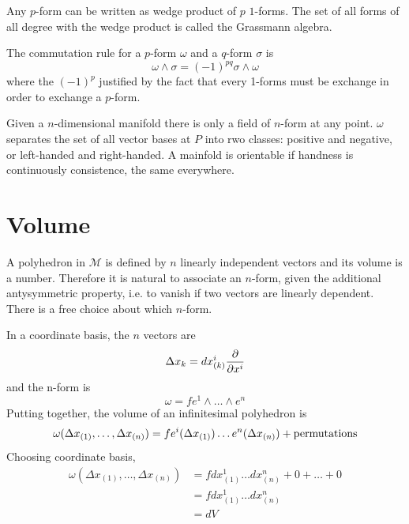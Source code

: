     Any $p$-form can be written as wedge product of $p$ $1$-forms. The set of all forms of all degree with the wedge product is called the Grassmann algebra. 

    The commutation rule for a $p$-form $\omega$ and a $q$-form $\sigma$ is 
    \begin{equation*}
        \omega \wedge \sigma = (-1)^{pq} \sigma \wedge \omega
    \end{equation*}
    where the $(-1)^p$ justified by the fact that every 1-forms must be exchange in order to exchange a $p$-form.

    Given a $n$-dimensional manifold there is only a field of $n$-form at any point. $\omega$ separates the set of all vector bases at $P$ into rwo classes: positive and negative, or left-handed and right-handed. A mainfold is orientable if handness is continuously consistence, the same everywhere. 

\section{Volume}   

    A polyhedron in $\mathcal M$ is defined by $n$ linearly independent vectors and its volume is a number. Therefore it is natural to associate an $n$-form, given the additional antysymmetric property, i.e. to vanish if two vectors are linearly dependent. There is a free choice about which $n$-form.
    
    In a coordinate basis, the $n$ vectors are
    \begin{equation*}
        \Delta x_k = dx^i_{(k)} \frac{\partial}{\partial x^i}
    \end{equation*}
    and the n-form is 
    \begin{equation*}
        \omega = f e^1 \wedge \ldots \wedge e^n
    \end{equation*}
    Putting together, the volume of an infinitesimal polyhedron is 
    \begin{equation*}
        \omega (\Delta x_{(1)}, \ldots, \Delta x_{(n)}) = f e^i(\Delta x_{(1)}) \ldots e^n(\Delta x_{(n)}) + \textnormal{permutations}
    \end{equation*}
    Choosing coordinate basis, 
    \begin{equation*}
    \begin{aligned}
        \omega (\Delta x_{(1)}, \ldots, \Delta x_{(n)}) & = f dx^1_{(1)} \ldots dx^n_{(n)} + 0 + \ldots + 0 \\ & = f dx^1_{(1)} \ldots dx^n_{(n)} \\ & = dV
    \end{aligned}
    \end{equation*}

